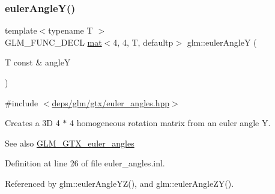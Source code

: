 \subsubsection{\texorpdfstring{euler\+Angle\+Y()}{eulerAngleY()}}
{\footnotesize\ttfamily template$<$typename T $>$ \\
G\+L\+M\+\_\+\+F\+U\+N\+C\+\_\+\+D\+E\+CL \hyperlink{structglm_1_1mat}{mat}$<$4, 4, T, defaultp$>$ glm\+::euler\+AngleY (\begin{DoxyParamCaption}\item[{T const \&}]{angleY }\end{DoxyParamCaption})}



{\ttfamily \#include $<$\hyperlink{euler__angles_8hpp}{deps/glm/gtx/euler\+\_\+angles.\+hpp}$>$}

Creates a 3D 4 $\ast$ 4 homogeneous rotation matrix from an euler angle Y. \begin{DoxySeeAlso}{See also}
\hyperlink{group__gtx__euler__angles}{G\+L\+M\+\_\+\+G\+T\+X\+\_\+euler\+\_\+angles} 
\end{DoxySeeAlso}


Definition at line 26 of file euler\+\_\+angles.\+inl.



Referenced by glm\+::euler\+Angle\+Y\+Z(), and glm\+::euler\+Angle\+Z\+Y().

